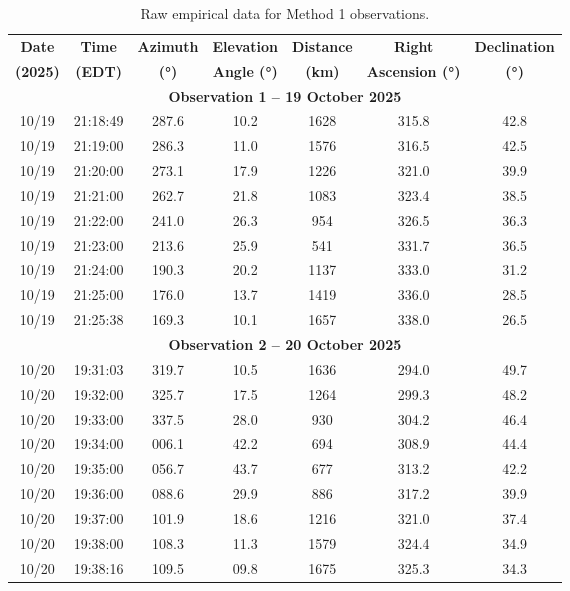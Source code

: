 \documentclass{article}
\begin{document}
\begin{table}[H]
    \centering
    \caption{Raw empirical data for Method 1 observations.}
    \label{tab:method1_data}
    \renewcommand{\arraystretch}{1.2}
    \begin{tabular}{|c|c|c|c|c|c|c|}
        \hline
        \textbf{Date} & \textbf{Time} & \textbf{Azimuth} & \textbf{Elevation} & \textbf{Distance} & \textbf{Right} & \textbf{Declination} \\ 
        \textbf{(2025)} & \textbf{(EDT)} & \textbf{(°)} & \textbf{Angle (°)} & \textbf{(km)} & \textbf{Ascension (°)} & \textbf{(°)} \\ \hline
        \multicolumn{7}{|c|}{\textbf{Observation 1 – 19 October 2025}} \\ \hline
        10/19 & 21:18:49 & 287.6 & 10.2 & 1628 & 315.8 & 42.8 \\ \hline
        10/19 & 21:19:00 & 286.3 & 11.0 & 1576 & 316.5 & 42.5 \\ \hline
        10/19 & 21:20:00 & 273.1 & 17.9 & 1226 & 321.0 & 39.9 \\ \hline
        10/19 & 21:21:00 & 262.7 & 21.8 & 1083 & 323.4 & 38.5 \\ \hline
        10/19 & 21:22:00 & 241.0 & 26.3 &  954 & 326.5 & 36.3 \\ \hline
        10/19 & 21:23:00 & 213.6 & 25.9 &  541 & 331.7 & 36.5 \\ \hline
        10/19 & 21:24:00 & 190.3 & 20.2 & 1137 & 333.0 & 31.2 \\ \hline
        10/19 & 21:25:00 & 176.0 & 13.7 & 1419 & 336.0 & 28.5 \\ \hline
        10/19 & 21:25:38 & 169.3 & 10.1 & 1657 & 338.0 & 26.5 \\ \hline
        \multicolumn{7}{|c|}{\textbf{Observation 2 – 20 October 2025}} \\ \hline
        10/20 & 19:31:03 & 319.7 & 10.5 & 1636 & 294.0 & 49.7 \\ \hline
        10/20 & 19:32:00 & 325.7 & 17.5 & 1264 & 299.3 & 48.2 \\ \hline
        10/20 & 19:33:00 & 337.5 & 28.0 &  930 & 304.2 & 46.4 \\ \hline
        10/20 & 19:34:00 & 006.1 & 42.2 &  694 & 308.9 & 44.4 \\ \hline
        10/20 & 19:35:00 & 056.7 & 43.7 &  677 & 313.2 & 42.2 \\ \hline
        10/20 & 19:36:00 & 088.6 & 29.9 &  886 & 317.2 & 39.9 \\ \hline
        10/20 & 19:37:00 & 101.9 & 18.6 & 1216 & 321.0 & 37.4 \\ \hline
        10/20 & 19:38:00 & 108.3 & 11.3 & 1579 & 324.4 & 34.9 \\ \hline
        10/20 & 19:38:16 & 109.5 & 09.8 & 1675 & 325.3 & 34.3 \\ \hline
    \end{tabular}
\end{table}
\end{document}
